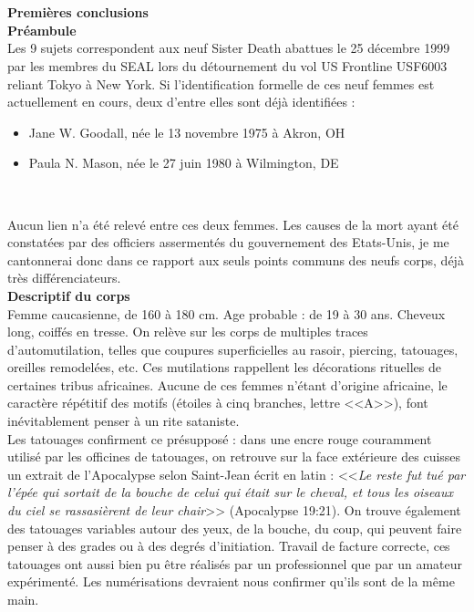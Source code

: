 \documentclass[11pt,twoside,a4paper]{book}
\begin{document}
~\\~\\

\textbf{Premi{\`e}res conclusions}~\\

\textbf{Pr{\'e}ambule}~\\
Les 9 sujets correspondent aux neuf Sister Death abattues le 25 d{\'e}cembre 1999 par les membres du SEAL lors du d{\'e}tournement du vol US Frontline USF6003 reliant Tokyo {\`a} New York. Si l'identification formelle de ces neuf femmes est actuellement en cours, deux d'entre elles sont d{\'e}j{\`a} identifi{\'e}es :
\setlength\parindent{50pt}
\begin{itemize}
	\item Jane W. Goodall, n{\'e}e le 13 novembre 1975 {\`a} Akron, OH
	\item Paula N. Mason, n{\'e}e le 27 juin 1980 {\`a} Wilmington, DE
\end{itemize}~\\
\setlength\parindent{00pt}

Aucun lien n'a {\'e}t{\'e} relev{\'e} entre ces deux femmes. Les causes de la mort ayant {\'e}t{\'e} constat{\'e}es par des officiers asserment{\'e}s du gouvernement des Etats-Unis, je me cantonnerai donc dans ce rapport aux seuls points communs des neufs corps, d{\'e}j{\`a} tr{\`e}s diff{\'e}renciateurs. ~\\

\textbf{Descriptif du corps}~\\

Femme caucasienne, de 160 {\`a} 180 cm. Age probable : de 19 {\`a} 30 ans. Cheveux long, coiff{\'e}s en tresse. On rel{\`e}ve sur les corps de multiples traces d'automutilation, telles que coupures superficielles au rasoir, piercing, tatouages, oreilles remodel{\'e}es, etc. Ces mutilations rappellent les d{\'e}corations rituelles de certaines tribus africaines. Aucune de ces femmes n'{\'e}tant d'origine africaine, le caract{\`e}re r{\'e}p{\'e}titif des motifs ({\'e}toiles {\`a} cinq branches, lettre <<A>>), font in{\'e}vitablement penser {\`a} un rite sataniste. ~\\

Les tatouages confirment ce pr{\'e}suppos{\'e} : dans une encre rouge couramment utilis{\'e} par les officines de tatouages, on retrouve sur la face ext{\'e}rieure des cuisses un extrait de l'Apocalypse selon Saint-Jean {\'e}crit en latin : <<\emph{Le reste fut tu{\'e} par l'{\'e}p{\'e}e qui sortait de la bouche de celui qui {\'e}tait sur le cheval, et tous les oiseaux du ciel se rassasi{\`e}rent de leur chair}>> (Apocalypse 19:21). On trouve {\'e}galement des tatouages variables autour des yeux, de la bouche, du coup, qui peuvent faire penser {\`a} des grades ou {\`a} des degr{\'e}s d'initiation. Travail de facture correcte, ces tatouages ont aussi bien pu {\^e}tre r{\'e}alis{\'e}s par un professionnel que par un amateur exp{\'e}riment{\'e}. Les num{\'e}risations devraient nous confirmer qu'ils sont de la m{\^e}me main. ~\\
\end{document}
